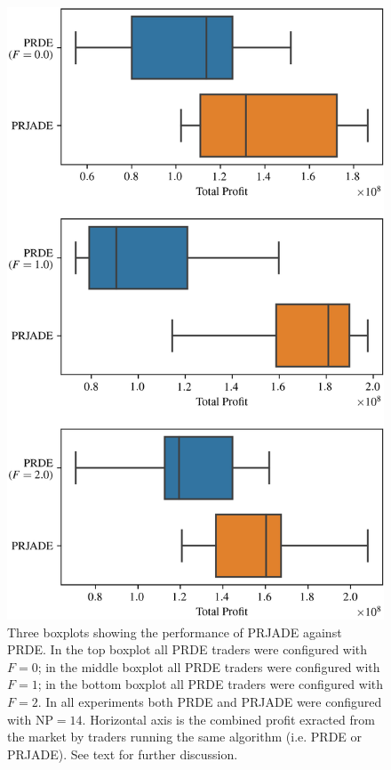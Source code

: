 \documentclass[conference]{IEEEtran}
\begin{document}
\begin{figure}[htbp]
    \centerline{\includegraphics[width=\columnwidth]{prjade_prde_boxplot.png}}
    \caption{
        Three boxplots showing the performance of PRJADE against PRDE.
        In the top boxplot all PRDE traders were configured with $F=0$; in the middle boxplot all PRDE traders were configured with $F=1$; in the bottom boxplot all PRDE traders were configured with $F=2$.
        In all experiments both PRDE and PRJADE were configured with $\mathrm{NP}=14$.
        Horizontal axis is the combined profit exracted from the market by traders running the same algorithm (i.e. PRDE or PRJADE).
        See text for further discussion.
    }
    \label{prjade_prde_boxplot}
\end{figure}
\end{document}
